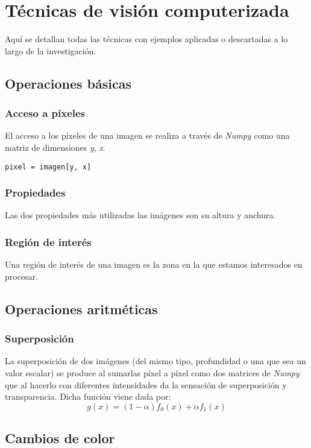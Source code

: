 \chapter{Técnicas de visión computerizada}
Aquí se detallan todas las técnicas con ejemplos aplicadas o
descartadas a lo largo de la investigación.
\section{Operaciones básicas}
\subsection{Acceso a píxeles}
El acceso a los píxeles de una imagen se realiza a través de
\emph{Numpy} como una matriz de dimensiones \emph{y}, \emph{x}.
\begin{verbatim}
pixel = imagen[y, x]
\end{verbatim}

\subsection{Propiedades}
Las dos propiedades más utilizadas las imágenes son su altura y anchura.

\subsection{Región de interés}
Una región de interés de una imagen es la zona en la que estamos
interesados en procesar.

\section{Operaciones aritméticas}
\subsection{Superposición}
La superposición de dos imágenes (del mismo tipo, profundidad o una
que sea un valor escalar) se produce al sumarlas píxel a píxel
como dos matrices de \emph{Numpy} que al hacerlo con diferentes
intensidades da la sensación de superposición y transparencia. Dicha función viene dada por:
\begin{equation*}
g(x) = (1 - \alpha)f_0(x) + \alpha f_1(x)
\end{equation*}

\section{Cambios de color}

